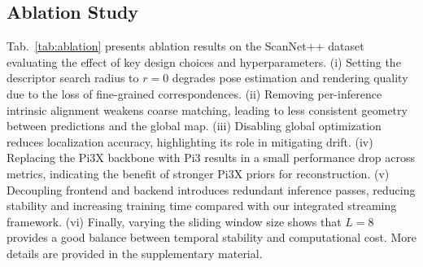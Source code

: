  



\begin{table}[t!]
\centering
\renewcommand{\arraystretch}{1.1} %
\setlength{\tabcolsep}{3pt}
\caption{\textbf{Ablation studies on the ScanNet++ dataset} evaluating the effect of key design choices and hyperparameters.}
\label{tab:ablation}

\end{table}

\subsection{Ablation Study}
Tab.~\ref{tab:ablation} presents ablation results on the ScanNet++ dataset evaluating the effect of key design choices and hyperparameters. (i) Setting the descriptor search radius to $r=0$ degrades pose estimation and rendering quality due to the loss of fine-grained correspondences. (ii) Removing per-inference intrinsic alignment weakens coarse matching, leading to less consistent geometry between predictions and the global map. (iii) Disabling global optimization reduces localization accuracy, highlighting its role in mitigating drift. (iv) Replacing the Pi3X backbone with Pi3 results in a small performance drop across metrics, indicating the benefit of stronger Pi3X priors for reconstruction. (v) Decoupling frontend and backend introduces redundant inference passes, reducing stability and increasing training time compared with our integrated streaming framework. (vi) Finally, varying the sliding window size shows that $L=8$ provides a good balance between temporal stability and computational cost. More details are provided in the supplementary material.

